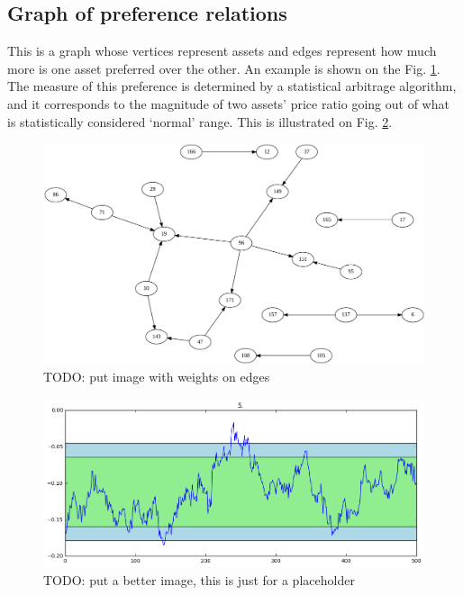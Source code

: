 \documentclass[letterpaper, 10 pt, conference]{ieeeconf}
\begin{document}
  \subsection{Graph of preference relations}
  
  This is a graph whose vertices represent assets and edges represent how much more is one asset preferred over the other.
  An example is shown on the Fig. \ref{fig:graph}.
  The measure of this preference is determined by a statistical arbitrage algorithm, and it corresponds to the magnitude of two assets' price ratio going out of what is statistically considered `normal' range.
  This is illustrated on Fig. \ref{fig:devmag}.
  
  \begin{figure}[htb]
    \centering
    \includegraphics[width=\columnwidth]{graphics/output_0573.pdf}
    \caption{TODO: put image with weights on edges}
    \label{fig:graph}
  \end{figure}
    
  \begin{figure}[htb]
    \centering
    \includegraphics[width=0.9\columnwidth]{graphics/deviation-magnitude.png}
    \caption{TODO: put a better image, this is just for a placeholder}
    \label{fig:devmag}
  \end{figure}
\end{document}
